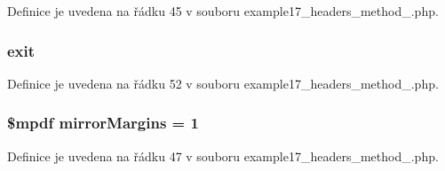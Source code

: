Definice je uvedena na řádku 45 v souboru example17\-\_\-headers\-\_\-method\-\_.\-php.

\hypertarget{example17__headers__method__3_8php_a6733eb5f605d09eaede9845835d71c4e}{
\subsubsection[{exit}]{\setlength{\rightskip}{0pt plus 5cm}exit}}\label{example17__headers__method__3_8php_a6733eb5f605d09eaede9845835d71c4e}


Definice je uvedena na řádku 52 v souboru example17\-\_\-headers\-\_\-method\-\_.\-php.

\hypertarget{example17__headers__method__3_8php_a24c284cb7774410f65953584ea1fd9c1}{
\subsubsection[{mirror\-Margins}]{\setlength{\rightskip}{0pt plus 5cm}\$mpdf mirror\-Margins = 1}}\label{example17__headers__method__3_8php_a24c284cb7774410f65953584ea1fd9c1}


Definice je uvedena na řádku 47 v souboru example17\-\_\-headers\-\_\-method\-\_.\-php.

